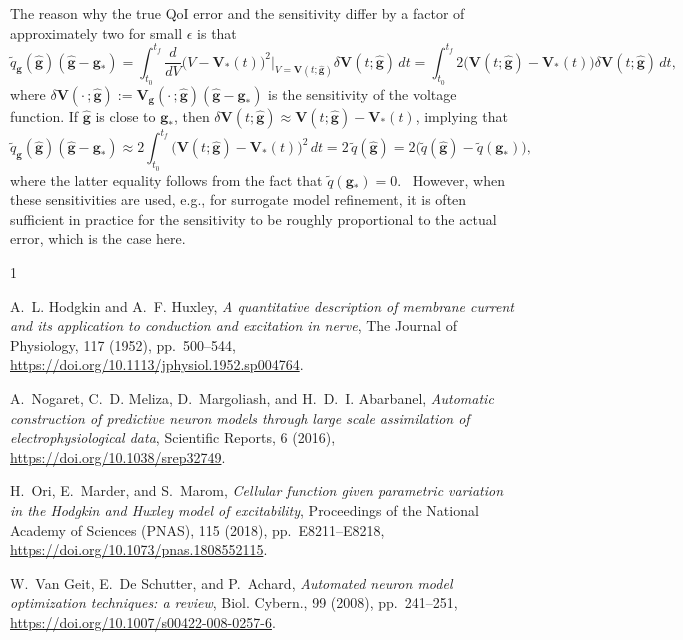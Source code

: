 \documentclass[onefignum,onetabnum]{siamart220329}
\numberwithin{equation}{section}
\newcommand{\bg}{\ensuremath{\mathbf{g}}} %
\newcommand{\BV}{\ensuremath{\mathbf{V}} } %
\begin{document}
The reason why the true QoI error and the sensitivity differ by a factor of approximately two for small $\epsilon$ is that
\[
	\widetilde{q}_\bg(\widehat{\bg}) (\widehat{\bg} - \bg_*) 
	= \int_{t_0}^{t_f} \frac{d}{dV} \big(V - \BV_*(t)\big)^2 \big|_{V = \BV(t; \widehat{\bg})} \delta \BV(t; \widehat{\bg}) \, dt 
	= \int_{t_0}^{t_f} 2 \big(\BV(t; \widehat{\bg}) - \BV_*(t)\big) \delta \BV(t; \widehat{\bg}) \, dt,
\]
where $\delta \BV(\cdot \, ; \widehat{\bg}) := \BV_\bg(\cdot \, ; \widehat{\bg}) (\widehat{\bg} - \bg_*) $ is the sensitivity of the voltage function.
If $\widehat{\bg}$ is close to $\bg_*$, then $\delta \BV(t; \widehat{\bg}) \approx \BV(t; \widehat{\bg}) - \BV_*(t)$, implying that
\[
	\widetilde{q}_\bg(\widehat{\bg}) (\widehat{\bg} - \bg_*) \approx 2 \int_{t_0}^{t_f} \big(\BV(t; \widehat{\bg}) - \BV_*(t)\big)^2 \, dt = 2 \, \widetilde{q}(\widehat{\bg}) = 2 \big(\widetilde{q}(\widehat{\bg}) - \widetilde{q}(\bg_*)\big),
\]
where the latter equality follows from the fact that $\widetilde{q}(\bg_*) = 0$. \ However, when these sensitivities are used, e.g.,
for surrogate model refinement, it is often sufficient in practice for the sensitivity to be roughly proportional to the actual error, which is the case here.







%
%
\begin{thebibliography}{1}

{\sc A.~L. Hodgkin and A.~F. Huxley}, {\em A quantitative description of
  membrane current and its application to conduction and excitation in nerve},
  The Journal of Physiology, 117 (1952), pp.~500--544,
  \url{https://doi.org/10.1113/jphysiol.1952.sp004764}.

{\sc A.~Nogaret, C.~D. Meliza, D.~Margoliash, and H.~D.~I. Abarbanel}, {\em
  Automatic construction of predictive neuron models through large scale
  assimilation of electrophysiological data}, Scientific Reports, 6 (2016),
    \url{https://doi.org/10.1038/srep32749}.

{\sc H.~Ori, E.~Marder, and S.~Marom}, {\em Cellular function given parametric
  variation in the {H}odgkin and {H}uxley model of excitability}, Proceedings
  of the National Academy of Sciences (PNAS), 115 (2018), pp.~E8211--E8218,
  \url{https://doi.org/10.1073/pnas.1808552115}.

{\sc W.~{Van Geit}, E.~{De Schutter}, and P.~Achard}, {\em Automated neuron
  model optimization techniques: a review}, Biol. Cybern., 99 (2008),
  pp.~241--251, 
  \url{https://doi.org/10.1007/s00422-008-0257-6}.

\end{thebibliography}



\end{document}
